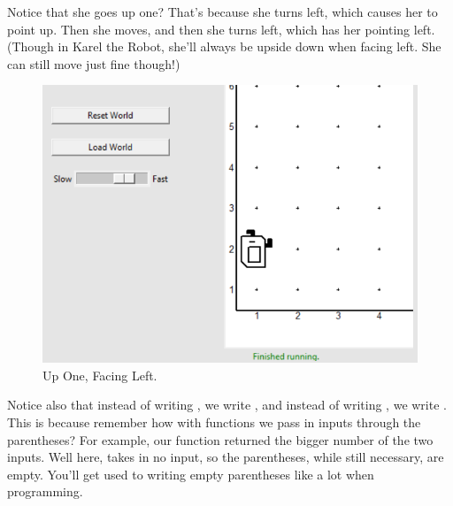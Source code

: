 \documentclass[12pt]{scrartcl}
\begin{document}
Notice that she goes up one? That's because she turns left, which causes her to point up. Then she moves, and then she turns left, which has her pointing left. (Though in Karel the Robot, she'll always be upside down when facing left. She can still move just fine though!)

\begin{figure}[H]
    \centering
    \includegraphics[scale=0.5]{Up One Face Left.png}
    \caption*{Up One, Facing Left.}
\end{figure}

Notice also that instead of writing , we write , and instead of writing , we write . This is because remember how with functions we pass in inputs through the parentheses? For example, our function  returned the bigger number of the two inputs. Well here,  takes in no input, so the parentheses, while still necessary, are empty. You'll get used to writing empty parentheses like \pythonl{()} a lot when programming.
\end{document}
